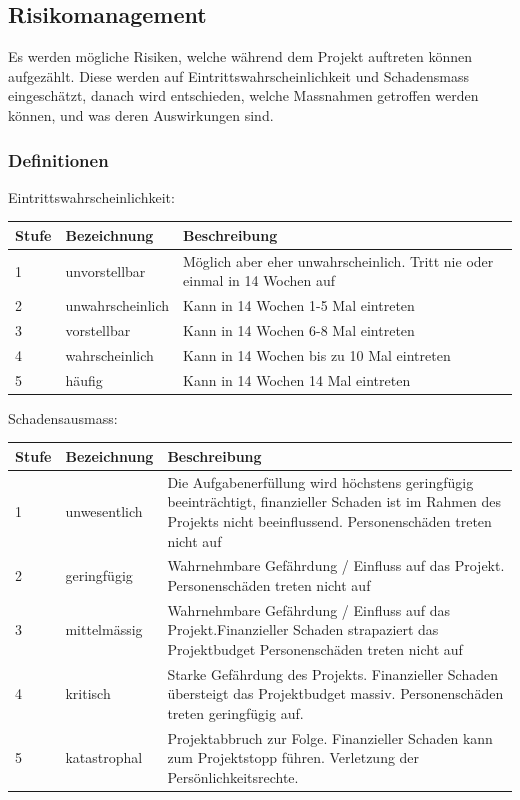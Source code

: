 \documentclass[a4paper]{scrreprt}
\begin{document}
\subsection{Risikomanagement}

Es werden mögliche Risiken, welche während dem Projekt auftreten können aufgezählt. Diese werden auf Eintrittswahrscheinlichkeit und Schadensmass eingeschätzt, danach wird entschieden, welche Massnahmen getroffen werden können, und was deren Auswirkungen sind.

\subsubsection{Definitionen}
\label{sssec:Def}
\vspace{1em}
\noindent
Eintrittswahrscheinlichkeit:

\vspace{1em}
\noindent
\begin{tabular}{|p{}|p{}|p{}|}
	\hline
	\textbf{Stufe} & \textbf{Bezeichnung} & \textbf{Beschreibung} \\
	\hline
	1 & unvorstellbar & Möglich aber eher unwahrscheinlich. Tritt nie oder einmal in 14 Wochen auf \\
	\hline
	2 & unwahrscheinlich & Kann in 14 Wochen 1-5 Mal eintreten\\
	\hline
	3 & vorstellbar & Kann in 14 Wochen 6-8 Mal eintreten \\
	\hline
	4 & wahrscheinlich & Kann in 14 Wochen bis zu 10 Mal eintreten \\
	\hline
	5 & häufig & Kann in 14 Wochen 14 Mal eintreten\\
	\hline
\end{tabular}

\vspace{1em}
\noindent
Schadensausmass:

\vspace{1em}
\noindent
\begin{tabular}{|p{}|p{}|p{}|}
	\hline
	\textbf{Stufe} & \textbf{Bezeichnung} & \textbf{Beschreibung} \\
	\hline
	1 & unwesentlich & Die Aufgabenerfüllung wird höchstens geringfügig beeinträchtigt, finanzieller Schaden ist im Rahmen des Projekts nicht beeinflussend. Personenschäden treten nicht auf \\
	\hline
	2 & geringfügig & Wahrnehmbare Gefährdung / Einfluss auf das Projekt. Personenschäden treten nicht auf \\
	\hline
	3 & mittelmässig & Wahrnehmbare Gefährdung / Einfluss auf das Projekt.Finanzieller Schaden strapaziert das Projektbudget
	Personenschäden treten nicht auf \\
	\hline
	4 & kritisch & Starke Gefährdung des Projekts. Finanzieller Schaden übersteigt das Projektbudget massiv. Personenschäden treten geringfügig auf.\\
	\hline
	5 & katastrophal & Projektabbruch zur Folge. Finanzieller Schaden kann zum Projektstopp führen. Verletzung der Persönlichkeitsrechte.
	\\
	\hline
\end{tabular}
\end{document}
